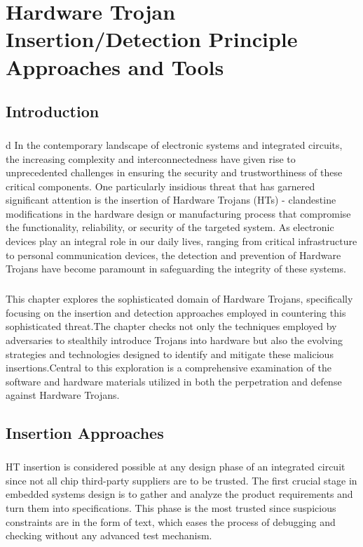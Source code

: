 \chapter{Hardware Trojan Insertion/Detection Principle Approaches and Tools}
\section{Introduction}
\paragraph*{}d
In the contemporary landscape of electronic systems and integrated circuits, the increasing complexity and interconnectedness have given rise to unprecedented challenges in ensuring the security and trustworthiness of these critical components. One particularly insidious threat that has garnered significant attention is the insertion of Hardware Trojans (HTs) - clandestine modifications in the hardware design or manufacturing process that compromise the functionality, reliability, or security of the targeted system. As electronic devices play an integral role in our daily lives, ranging from critical infrastructure to personal communication devices, the detection and prevention of Hardware Trojans have become paramount in safeguarding the integrity of these systems.
\paragraph*{}
This chapter explores the sophisticated domain of Hardware Trojans, specifically focusing on the insertion and detection approaches employed in countering this sophisticated threat.The chapter checks not only the techniques employed by adversaries to stealthily introduce Trojans into hardware but also the evolving strategies and technologies designed to identify and mitigate these malicious insertions.Central to this exploration is a comprehensive examination of the software and hardware materials utilized in both the perpetration and defense against Hardware Trojans.
\section{Insertion Approaches}
\paragraph*{}
HT insertion is considered possible at any design phase of an integrated circuit since not all chip third-party suppliers are to be trusted. The first crucial stage in embedded systems design is to gather and analyze the product requirements and turn them into specifications. This phase is the most trusted since suspicious constraints are in the form of text, which eases the process of debugging and checking without any advanced test mechanism.
